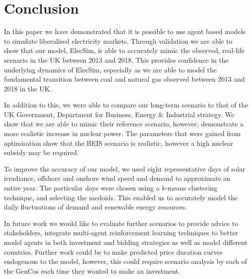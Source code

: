 






\section{Conclusion}
\label{sec:conclusion}

In this paper we have demonstrated that it is possible to use agent based models to simulate liberalised electricity markets. Through validation we are able to show that our model, ElecSim, is able to accurately mimic the observed, real-life scenario in the UK between 2013 and 2018. This provides confidence in the underlying dynamics of ElecSim, especially as we are able to model the fundamental transition between coal and natural gas observed between 2013 and 2018 in the UK.

In addition to this, we were able to compare our long-term scenario to that of the UK Government, Department for Business, Energy \& Industrial strategy. We show that we are able to mimic their reference scenario, however, demonstrate a more realistic increase in nuclear power. The parameters that were gained from optimisation show that the BEIS scenario is realistic, however a high nuclear subsidy may be required.

To improve the accuracy of our model, we used eight representative days of solar irradiance, offshore and onshore wind speed and demand to approximate an entire year. The particular days were chosen using a $k$-means clustering technique, and selecting the medoids. This enabled us to accurately model the daily fluctuations of demand and renewable energy resources. 


In future work we would like to evaluate further scenarios to provide advice to stakeholders, integrate multi-agent reinforcement learning techniques to better model agents in both investment and bidding strategies as well as model different countries. Further work could be to make predicted price duration curves endogenous to the model, however, this could require scenario analysis by each of the GenCos each time they wanted to make an investment.

